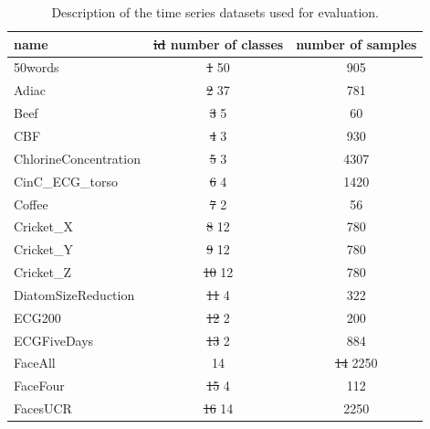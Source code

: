\documentclass[natbib,smallextended]{svjour3}
\providecommand{\DIFdeltex}[1]{{\protect\color{red}\sout{#1}}}                      %
\providecommand{\DIFdelFL}[1]{\DIFdel{#1}} %
\providecommand{\DIFaddbeginFL}{} %
\providecommand{\DIFaddendFL}{} %
\providecommand{\DIFdelbeginFL}{} %
\providecommand{\DIFdelendFL}{} %
\providecommand{\DIFdel}[1]{\texorpdfstring{\DIFdeltex{#1}}{}} %
\begin{document}
\begin{table} [h!]
\begin{center}
\caption{Description of the time series datasets used for evaluation.}
\label{didtNoda1}
\small
 \setlength{\tabcolsep}{.16667em}
\DIFdelbeginFL %
\DIFdelendFL \DIFaddbeginFL \begin{tabular}{lcc}
\DIFaddendFL name & \DIFdelbeginFL \DIFdelFL{id }%
\DIFdelendFL number of classes & number of samples \\
\hline
50words & \DIFdelbeginFL \DIFdelFL{1 }%
\DIFdelendFL 50 &  905 \\
Adiac & \DIFdelbeginFL \DIFdelFL{2 }%
\DIFdelendFL 37 &  781 \\
Beef &  \DIFdelbeginFL \DIFdelFL{3 }%
\DIFdelendFL 5 &   60 \\
CBF  &  \DIFdelbeginFL \DIFdelFL{4 }%
\DIFdelendFL 3 &  930 \\
ChlorineConcentration  &  \DIFdelbeginFL \DIFdelFL{5 }%
\DIFdelendFL 3 & 4307 \\
CinC\_ECG\_torso  &  \DIFdelbeginFL \DIFdelFL{6 }%
\DIFdelendFL 4 & 1420 \\
Coffee  &  \DIFdelbeginFL \DIFdelFL{7 }%
\DIFdelendFL 2 &   56 \\
Cricket\_X  & \DIFdelbeginFL \DIFdelFL{8 }%
\DIFdelendFL 12 &  780 \\
Cricket\_Y  & \DIFdelbeginFL \DIFdelFL{9 }%
\DIFdelendFL 12 &  780 \\
Cricket\_Z  & \DIFdelbeginFL \DIFdelFL{10 }%
\DIFdelendFL 12 &  780 \\
DiatomSizeReduction  &  \DIFdelbeginFL \DIFdelFL{11 }%
\DIFdelendFL 4 &  322 \\
ECG200  &  \DIFdelbeginFL \DIFdelFL{12 }%
\DIFdelendFL 2 &  200 \\
ECGFiveDays  &  \DIFdelbeginFL \DIFdelFL{13 }%
\DIFdelendFL 2 &  884 \\
FaceAll &  14 & \DIFdelbeginFL \DIFdelFL{14 }%
\DIFdelendFL 2250 \\
FaceFour &   \DIFdelbeginFL \DIFdelFL{15 }%
\DIFdelendFL 4 &  112 \\
FacesUCR &  \DIFdelbeginFL \DIFdelFL{16 }%
\DIFdelendFL 14 & 2250 \\

\end{tabular}
\end{center}
\end{table}
\end{document}

